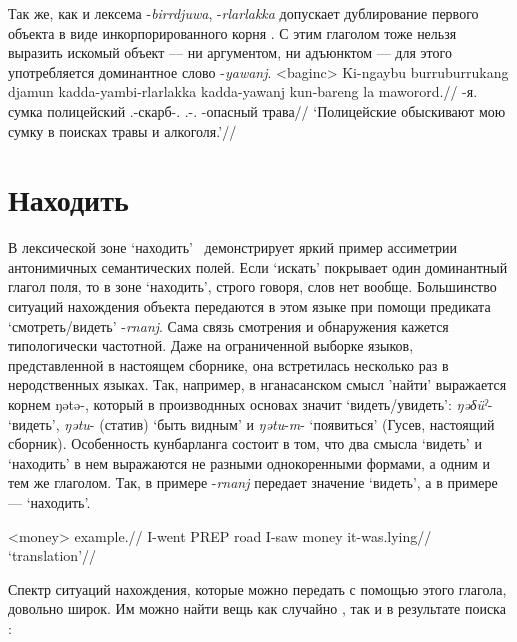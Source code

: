 Так же, как и лексема -\textit{birrdjuwa}, -\textit{rlarlakka} допускает дублирование первого объекта в виде инкорпорированного корня . С этим глаголом тоже нельзя выразить искомый объект --- ни аргументом, ни адъюнктом --- для этого употребляется доминантное слово -\textit{yawanj}.
\ex<baginc>\begingl
\gla Ki-ngaybu burruburrukang djamun kadda-yambi-rlarlakka kadda-yawanj kun-bareng la maworord.//
\glb \ki-я.\Gen{} сумка полицейский \Tpl.\Real-скарб-\rlk.\Np{} \Tpl.\Real-\yaw.\Np{} \Cliv-опасный \la{} трава//
\glft `Полицейские обыскивают мою сумку в поисках травы и алкоголя.'//%
\endgl\xe


\section{Находить}
\label{sec:find}

В лексической зоне `находить' \ демонстрирует яркий пример ассиметрии антонимичных семантических полей. Если `искать' покрывает один доминантный
глагол поля, то в зоне `находить', строго говоря, слов нет вообще. Большинство ситуаций нахождения объекта передаются в этом языке при помощи предиката
`смотреть/видеть' -\textit{rnanj}. Сама связь смотрения и обнаружения кажется типологически частотной. Даже на ограниченной выборке языков, представленной в настоящем сборнике, она встретилась несколько раз в неродственных языках. Так, например, в нганасанском смысл 'найти' выражается корнем ŋətə-, который в производнных основах значит `видеть/увидеть': \textit{ŋəδüˀ}- `видеть', \textit{ŋətu}- (статив) `быть видным' и \textit{ŋətu}-\textit{m}- `появиться' (Гусев, настоящий сборник). Особенность кунбарланга состоит в том, что два смысла `видеть' и `находить' в нем выражаются не разными однокоренными формами, а одним и тем же глаголом. Так, в примере  -\textit{rnanj} передает значение `видеть', а в примере  --- `находить'.

\ex<money>\begingl
\gla example.//
\glb I-went PREP road I-saw money it-was.lying//
\glft `translation'//
\endgl\xe

Спектр ситуаций нахождения, которые можно передать с помощью этого глагола, довольно широк. Им можно найти вещь как случайно , так и в результате поиска :


